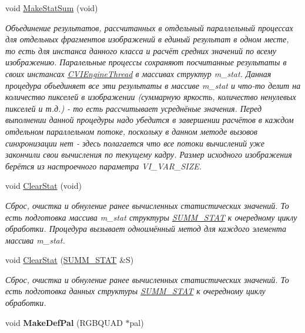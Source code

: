 \begin{DoxyCompactItemize}
$$void \hyperlink{class_c_v_i_engine_base_a2b86bf7f377f62e7a701fb3466708d04}{Make\+Stat\+Sum} (void)
\begin{DoxyCompactList}\small\item\em Объединение результатов, рассчитанных в отдельный параллельный процессах для отдельных фрагментов изображений в единый результат в одном месте, то есть для инстанса данного класса и расчёт средних значений по всему изображению. Паралельные процессы сохраняют посчитанные результаты в своих инстансах \hyperlink{class_c_v_i_engine_thread}{C\+V\+I\+Engine\+Thread} в массивах структур m\+\_\+stat. Данная процедура объединяет все эти результаты в массиве m\+\_\+stat и что-\/то делит на количество пикселей в изображении (суммарную яркость, количество ненулевых пикселей и т.\+д.) -\/ то есть рассчитывает усреднёные значения. Перед выполнении данной процедуры надо убедится в завершении расчётов в каждом отдельном параллельном потоке, поскольку в данном методе вызовов синхронизации нет -\/ здесь полагается что все потоки вычислений уже закончили свои вычисления по текущему кадру. Размер исходного изображения берётся из настроечного параметра V\+I\+\_\+\+V\+A\+R\+\_\+\+S\+I\+Z\+E. \end{DoxyCompactList}\item 
void \hyperlink{class_c_v_i_engine_base_a10d6138a2c8f4c4c946bf930c268be6b}{Clear\+Stat} (void)
\begin{DoxyCompactList}\small\item\em Сброс, очистка и обнуление ранее вычисленных статистических значений. То есть подготовка массива m\+\_\+stat структуры \hyperlink{class_s_u_m_m___s_t_a_t}{S\+U\+M\+M\+\_\+\+S\+T\+A\+T} к очередному циклу обработки. Процедура вызывает одноимённый метод для каждого элемента массива m\+\_\+stat. \end{DoxyCompactList}\item 
void \hyperlink{class_c_v_i_engine_base_adb910c0d7f06cf1f3ea7b2347aed1751}{Clear\+Stat} (\hyperlink{class_s_u_m_m___s_t_a_t}{S\+U\+M\+M\+\_\+\+S\+T\+A\+T} \&S)
\begin{DoxyCompactList}\small\item\em Сброс, очистка и обнуление ранее вычисленных статистических значений. То есть подготовка данных структуры \hyperlink{class_s_u_m_m___s_t_a_t}{S\+U\+M\+M\+\_\+\+S\+T\+A\+T} к очередному циклу обработки. \end{DoxyCompactList}\item 
\hypertarget{class_c_v_i_engine_base_a96dd47cc32f324e133644e7f823507ad}{void {\bfseries Make\+Def\+Pal} (R\+G\+B\+Q\+U\+A\+D $\ast$pal)}\label{class_c_v_i_engine_base_a96dd47cc32f324e133644e7f823507ad}


\end{DoxyCompactItemize}
